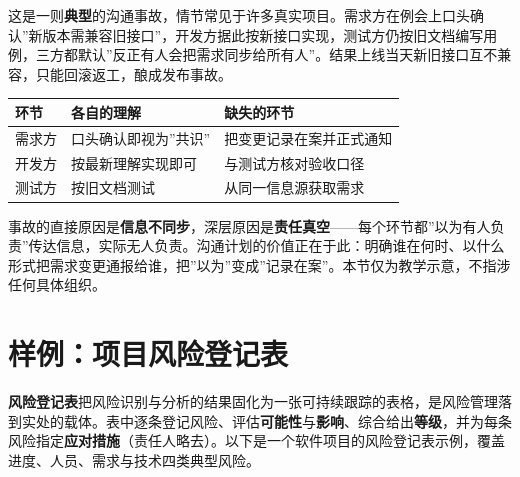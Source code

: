 \documentclass[12pt,a4paper,twoside,openany]{ctexbook}
\numberwithin{figure}{chapter}
\numberwithin{table}{chapter}
\newcounter{none}
\begin{document}
这是一则\textbf{典型}的沟通事故，情节常见于许多真实项目。需求方在例会上口头确认''新版本需兼容旧接口''，开发方据此按新接口实现，测试方仍按旧文档编写用例，三方都默认''反正有人会把需求同步给所有人''。结果上线当天新旧接口互不兼容，只能回滚返工，酿成发布事故。

{\def\LTcaptype{none} %
\begin{longtable}[]{@{}lll@{}}
\toprule\noalign{}
环节 & 各自的理解 & 缺失的环节 \\
\midrule\noalign{}
\endhead
\bottomrule\noalign{}
\endlastfoot
需求方 & 口头确认即视为''共识'' & 把变更记录在案并正式通知 \\
开发方 & 按最新理解实现即可 & 与测试方核对验收口径 \\
测试方 & 按旧文档测试 & 从同一信息源获取需求 \\
\end{longtable}
}

事故的直接原因是\textbf{信息不同步}，深层原因是\textbf{责任真空}------每个环节都''以为有人负责''传达信息，实际无人负责。沟通计划的价值正在于此：明确谁在何时、以什么形式把需求变更通报给谁，把''以为''变成''记录在案''。本节仅为教学示意，不指涉任何具体组织。

\section{样例：项目风险登记表}\label{ux6837ux4f8bux9879ux76eeux98ceux9669ux767bux8bb0ux8868}

\textbf{风险登记表}把风险识别与分析的结果固化为一张可持续跟踪的表格，是风险管理落到实处的载体。表中逐条登记风险、评估\textbf{可能性}与\textbf{影响}、综合给出\textbf{等级}，并为每条风险指定\textbf{应对措施}（责任人略去）。以下是一个软件项目的风险登记表示例，覆盖进度、人员、需求与技术四类典型风险。
\end{document}
